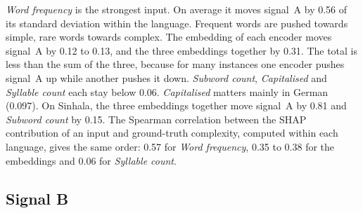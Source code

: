\emph{Word frequency} is the strongest input. On average it moves signal~A by 0.56 of its standard %
deviation within the language. Frequent words are pushed towards simple, rare words towards
complex. The embedding of each encoder moves signal~A by 0.12 to 0.13, and the three embeddings %
together by 0.31. The total is less than the sum of the three, because for many instances one %
encoder pushes signal~A up while another pushes it down. \emph{Subword count}, \emph{Capitalised} %
and \emph{Syllable count} each stay below 0.06. \emph{Capitalised} matters mainly in German %
(0.097). On Sinhala, the three embeddings together move signal~A by 0.81 and \emph{Subword count} %
by 0.15. The Spearman correlation between the SHAP contribution of an input and ground-truth %
complexity, computed within each language, gives the same order: 0.57 for \emph{Word frequency}, %
0.35 to 0.38 for the embeddings and 0.06 for \emph{Syllable count}.

\subsection{Signal B}
\label{sec:results-b}

